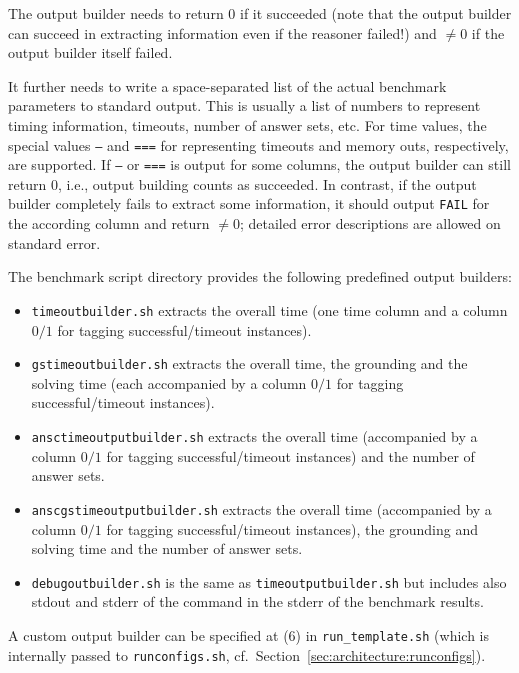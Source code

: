 \documentclass[a4paper]{article}
\begin{document}
			The output builder needs to return $0$ if it succeeded (note that the output builder can succeed in extracting information even if the reasoner failed!)
			and $\not=0$ if the output builder itself failed.
			
			It further needs to write a space-separated list of the actual benchmark parameters to standard output.
			This is usually a list of numbers to represent timing information, timeouts, number of answer sets, etc. For time values,
			the special values {\tt ---} and {\tt ===} for representing timeouts and memory outs, respectively, are supported.
			If {\tt ---} or {\tt ===} is output for some columns, the output builder can still return $0$, i.e.,
			output building counts as succeeded.
			In contrast, if the output builder completely fails to extract some information, it should output {\tt FAIL} for the according column
			and return $\not=0$; detailed error descriptions are allowed on standard error.
			
			The benchmark script directory provides the following predefined output builders:
					
			\begin{itemize}
			    \item {\tt timeoutbuilder.sh} extracts the overall time (one time column and a column $0/1$ for tagging successful/timeout instances).
			    \item {\tt gstimeoutbuilder.sh} extracts the overall time, the grounding and the solving time (each accompanied by a column $0/1$ for tagging successful/timeout instances).
			    \item {\tt ansctimeoutputbuilder.sh} extracts the overall time (accompanied by a column $0/1$ for tagging successful/timeout instances) and the number of answer sets.
                            \item {\tt anscgstimeoutputbuilder.sh} extracts the overall time (accompanied by a column $0/1$ for tagging successful/timeout instances), the grounding and solving time and the number of answer sets.
                            \item {\tt debugoutbuilder.sh} is the same as {\tt timeoutputbuilder.sh} but includes also stdout and stderr of the command in the stderr of the benchmark results.
			\end{itemize}

			A custom output builder can be specified at (6) in {\tt run\_template.sh} (which is internally passed to {\tt runconfigs.sh}, cf.~Section~\ref{sec:architecture:runconfigs}).
\end{document}
